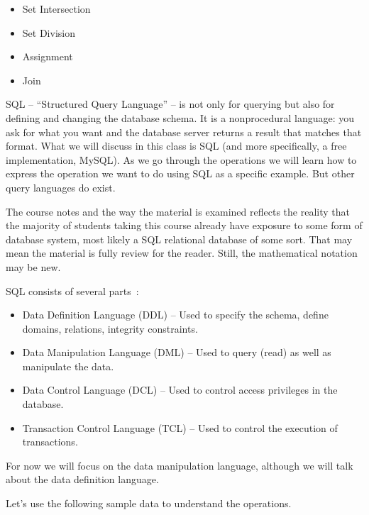 \begin{itemize}
	\item Set Intersection
	\item Set Division
	\item Assignment
	\item Join
\end{itemize}

SQL -- ``Structured Query Language'' -- is not only for querying but also for defining and changing the database schema. It is a nonprocedural language: you ask for what you want and the database server returns a result that matches that format. What we will discuss in this class is SQL (and more specifically, a free implementation, MySQL). As we go through the operations we will learn how to express the operation we want to do using SQL as a specific example. But other query languages do exist.

The course notes and the way the material is examined reflects the reality that the majority of students taking this course already have exposure to some form of database system, most likely a SQL relational database of some sort. That may mean the material is fully review for the reader. Still, the mathematical notation may be new.

SQL consists of several parts~\cite{dsc}:
\begin{itemize}
	\item Data Definition Language (DDL) -- Used to specify the schema, define domains, relations, integrity constraints.
	\item Data Manipulation Language (DML) -- Used to query (read) as well as manipulate the data.
	\item Data Control Language (DCL) -- Used to control access privileges in the database. 
	\item Transaction Control Language (TCL) -- Used to control the execution of transactions.
\end{itemize}

For now we will focus on the data manipulation language, although we will talk about the data definition language.

Let's use the following sample data to understand the operations.


